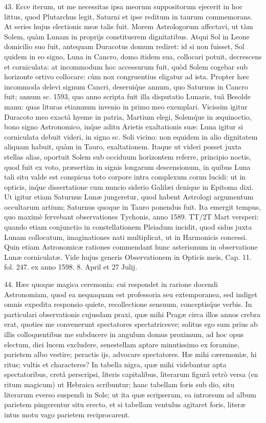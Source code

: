 \documentclass[a4paper, 11pt, oneside, polutonikogreek, german]{article}
\begin{document}
43. Ecce iterum, ut me necessitas ipsa meorum suppositorum ejecerit in hoc littus, quod Plutarchus legit, Saturni et ipse reditum in taurum commemorans. At series hujus electionis meæ talis fuit. Morem Astrologorum affectavi, ut tàm Solem, quàm Lunam in proprijs constituerem dignitatibus. Atqui Sol in Leone domicilio suo fuit, antequam Duracotus domum rediret: id si non fuisset, Sol quidem in eo signo, Luna in Cancro, domo itidem sua, collocari potuit, decrescens et corniculata: at incommodum hoc accessurum fuit, quòd Solem cogebar sub horizonte ortivo collocare: cùm nox congruentius eligatur ad ista. Propter hæc incommoda delevi signum Cancri, deserui\'que annum, quo Saturnus in Cancro fuit; annum sc. 1593, quo anno scripta fuit illa disputatio Lunaris, tuâ Besolde manu: quas lituras etiamnum invenio in primo meo exemplari. Vicissim igitur Duracoto meo exactâ hyeme in patria, Martium elegi, Solem\'que in æquinoctio, bono signo Astronomico, in\'que aditu Arietis exaltationis suæ: Luna igitur si corniculata debuit videri, in signo sc. Soli vicino: non equidem in alio dignitatem aliquam habuit, quàm in Tauro, exaltationem. Itaque ut videri posset juxta stellas alias, oportuit Solem sub occiduum horizontem referre, principio noctis, quod fuit ex voto, præsertim in signis longarum descensionum, in quibus Luna tali situ valde est conspicua toto corpore intra complexum cornu lucidi: ut in opticis, in\'que dissertatione cum nuncio siderio Galilæi denique in Epitoma dixi. Ut igitur etiam Saturnus Lunæ jungeretur, quod habent Astrologi argumentum occultarum artium; Saturnus quoque in Tauro ponendus fuit. Ita emergit tempus, quo maximè fervebant observationes Tychonis, anno 1589. TT/2T Mart versperi: quando etiam conjunctio in constellationem Pleiadum incidit, quod sidus juxta Lunam collocatum, imaginationes nati multiplicat, ut in Harmonicis concessi. Quin etiam Astronomicæ rationes commendant hunc asterismum in observatione Lunæ corniculatæ. Vide hujus generis Observationem in Opticis meis, Cap. 11. fol. 247. ex anno 1598. 8. April et 27 Julij.

44. Hæc quoque magica ceremonia: cui respondet in rarione docendi Astronomiam, quod ea nequaquam est professoria seu extemporanea, sed indiget omnis expedita responsio quiete, recollectione sensuum, conceptis\'que verbis. In particulari observationis cujusdam praxi, quæ mihi Pragæ circa illos annos crebra erat, quoties me convenerunt spectatores spectatricesve; solitus ego sum prius ab illis colloquentibus me subducere in angulum domus proximum, ad hoc opus electum, diei lucem excludere, senestellam aptare minutissimo ex foramine, parietem albo vestire; peractis ijs, advocare spectatores. Hæ mihi cæremoniæ, hi ritus; vultis et characteres? In tabella nigra, quæ mihi videbantur apta spectatoribus, cretâ perscripsi, literis capitalibus, literarum figurâ retrò versa (en ritum magicum) ut Hebraica scribuntur; hanc tabellam foris sub dio, situ literarum everso suspendi in Sole; ut ita quæ scripseram, ea introrsum ad album parietem pingerentur situ erecto, et si tabellam ventulus agitaret foris, literæ intus motu vago parietem reciprocarent.
\end{document}
